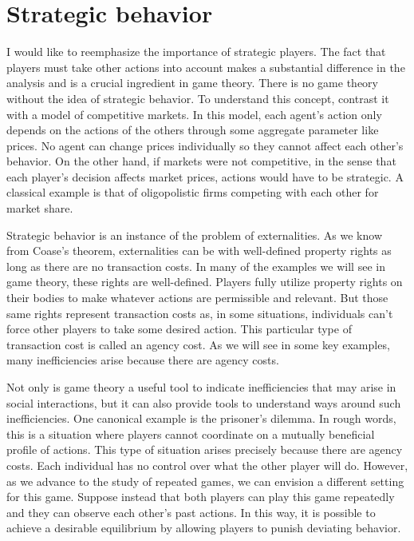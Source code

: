 \documentclass[../../main.tex]{subfiles}
\begin{document}
\section{Strategic behavior}
I would like to reemphasize the importance of strategic players. The fact that players must take other actions into account makes a substantial difference in the analysis and is a crucial ingredient in game theory. There is no game theory without the idea of strategic behavior. To understand this concept, contrast it with a model of competitive markets. In this model, each agent's action only depends on the actions of the others through some aggregate parameter like prices. No agent can change prices individually so they cannot affect each other's behavior. On the other hand, if markets were not competitive, in the sense that each player's decision affects market prices, actions would have to be strategic. A classical example is that of oligopolistic firms competing with each other for market share.

Strategic behavior is an instance of the problem of externalities. As we know from Coase's theorem, externalities can be  with well-defined property rights as long as there are no transaction costs. In many of the examples we will see in game theory, these rights are well-defined. Players fully utilize property rights on their bodies to make whatever actions are permissible and relevant. But those same rights represent transaction costs as, in some situations, individuals can't force other players to take some desired action. This particular type of transaction cost is called an agency cost. As we will see in some key examples, many inefficiencies arise because there are agency costs. 

Not only is game theory a useful tool to indicate inefficiencies that may arise in social interactions, but it can also provide tools to understand ways around such inefficiencies. One canonical example is the prisoner's dilemma. In rough words, this is a situation where players cannot coordinate on a mutually beneficial profile of actions. This type of situation arises precisely because there are agency costs. Each individual has no control over what the other player will do. However, as we advance to the study of repeated games, we can envision a different setting for this game. Suppose instead that both players can play this game repeatedly and they can observe each other's past actions. In this way, it is possible to achieve a desirable equilibrium by allowing players to punish deviating behavior.
\end{document}
